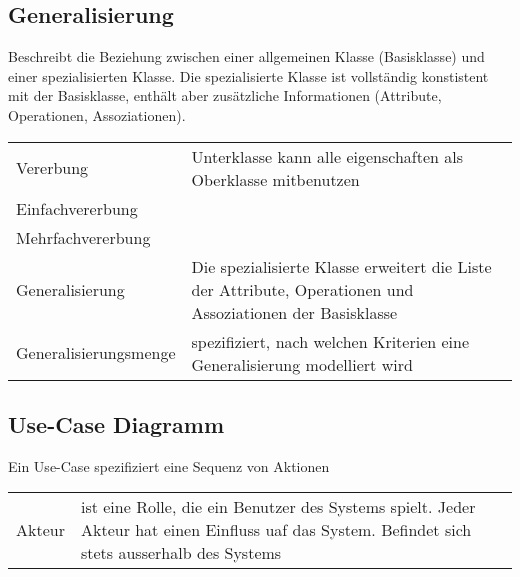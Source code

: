 \subsection{Generalisierung}
Beschreibt die Beziehung zwischen einer allgemeinen Klasse (Basisklasse) und
einer spezialisierten Klasse. Die spezialisierte Klasse ist vollständig
konstistent mit der Basisklasse, enthält aber zusätzliche Informationen
(Attribute, Operationen, Assoziationen).\\
	\begin{tabular}{p{3.5cm}p{14.5cm}}
		Vererbung & Unterklasse kann alle eigenschaften als Oberklasse mitbenutzen\\
		Einfachvererbung & \\
		Mehrfachvererbung & \\
		Generalisierung & Die spezialisierte Klasse erweitert die Liste der Attribute,
		Operationen und Assoziationen der Basisklasse\\
		Generalisierungsmenge & spezifiziert, nach welchen Kriterien eine
		Generalisierung modelliert wird\\
	\end{tabular}
	
\subsection{Use-Case Diagramm}
	Ein Use-Case spezifiziert eine Sequenz von Aktionen
	\begin{tabular}{p{3.5cm}p{14.5cm}}
		Akteur & ist eine Rolle, die ein Benutzer des Systems spielt. Jeder Akteur hat
		einen Einfluss uaf das System. Befindet sich stets ausserhalb des Systems\\
	\end{tabular}
